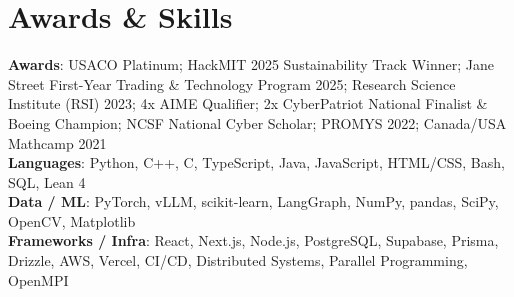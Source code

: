 \documentclass[letterpaper,10.5pt]{article}
\begin{document}
\section{Awards \& Skills}
 \begin{itemize}[leftmargin=0.15in, label={}]
    \small{\item{
     \textbf{Awards}{: USACO Platinum; HackMIT 2025 Sustainability Track Winner; Jane Street First-Year Trading \& Technology Program 2025; Research Science Institute (RSI) 2023; 4x AIME Qualifier; 2x CyberPatriot National Finalist \& Boeing Champion; NCSF National Cyber Scholar; PROMYS 2022; Canada/USA Mathcamp 2021} \\ \vspace{1pt}
     \textbf{Languages}{: Python, C++, C, TypeScript, Java, JavaScript, HTML/CSS, Bash, SQL, Lean 4} \\ \vspace{1pt}
     \textbf{Data / ML}{: PyTorch, vLLM, scikit-learn, LangGraph, NumPy, pandas, SciPy, OpenCV, Matplotlib} \\ \vspace{1pt}
     \textbf{Frameworks / Infra}{: React, Next.js, Node.js, PostgreSQL, Supabase, Prisma, Drizzle, AWS, Vercel, CI/CD, Distributed Systems, Parallel Programming, OpenMPI}
    }}
 \end{itemize}
\end{document}
